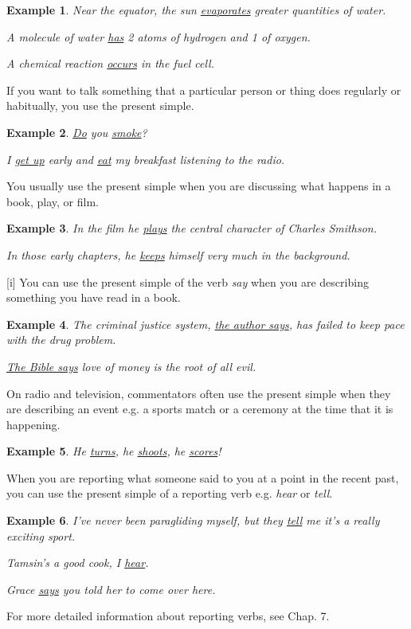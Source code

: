 \documentclass[oneside]{book}
\numberwithin{equation}{section}
\newtheorem{example}{Example}[section]
\begin{document}
\begin{example}
    Near the equator, the sun \underline{evaporates} greater quantities of water.
    
    A molecule of water \underline{has} 2 atoms of hydrogen and 1 of oxygen.
    
    A chemical reaction \underline{occurs} in the fuel cell.
\end{example}
%
\noindent{} If you want to talk something that a particular person or thing does regularly or habitually, you use the present simple.
\begin{example}
    \underline{Do} you \underline{smoke}?
    
    I \underline{get up} early and \underline{eat} my breakfast listening to the radio.
\end{example}
%
\noindent{} You usually use the present simple when you are discussing what happens in a book, play, or film.
\begin{example}
    In the film he \underline{plays} the central character of Charles Smithson.
    
    In those early chapters, he \underline{keeps} himself very much in the background.
\end{example}
%
\noindent{} [i] You can use the present simple of the verb \textit{say} when you are describing something you have read in a book.
\begin{example}
    The criminal justice system, \underline{the author says}, has failed to keep pace with the drug problem.
    
    \underline{The Bible says} love of money is the root of all evil.
\end{example}
%
\noindent{} On radio and television, commentators often use the present simple when they are describing an event e.g. a sports match or a ceremony at the time that it is happening.
\begin{example}
    He \underline{turns}, he \underline{shoots}, he \underline{scores}!
\end{example}
%
\noindent{} When you are reporting what someone said to you at a point in the recent past, you can use the present simple of a reporting verb e.g. \textit{hear} or \textit{tell}.
\begin{example}
    I've never been paragliding myself, but they \underline{tell} me it's a really exciting sport.
    
    Tamsin's a good cook, I \underline{hear}.
    
    Grace \underline{says} you told her to come over here.
\end{example}
For more detailed information about reporting verbs, see Chap. 7.
\end{document}
